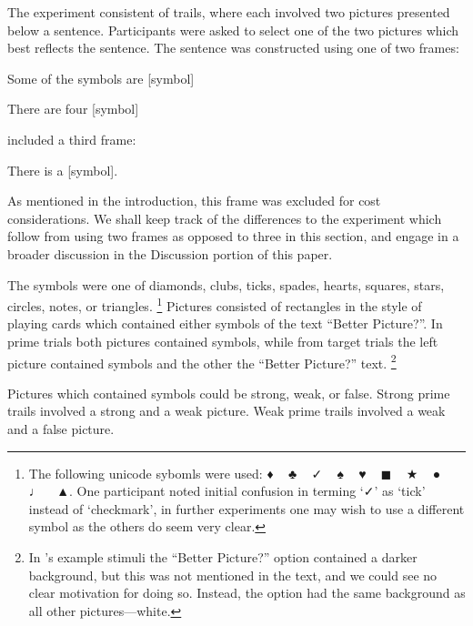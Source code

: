 \documentclass[10pt]{article}
\begin{document}
\begin{multicols}{2}
The experiment consistent of trails, where each involved two pictures presented below a sentence.
Participants were asked to select one of the two pictures which best reflects the sentence.
The sentence was constructed using one of two frames:
\begin{enumerate*}[label=(\roman*)]
\item Some of the symbols are [symbol]
\item There are four [symbol]
\end{enumerate*}
\citeauthor{Bott:2016aa} included a third frame:
\begin{enumerate*}[label=(\roman*), resume]
\item There is a [symbol].
\end{enumerate*}
As mentioned in the introduction, this frame was excluded for cost considerations.
We shall keep track of the differences to the experiment which follow from using two frames as opposed to three in this section, and engage in a broader discussion in the Discussion portion of this paper.

The symbols were one of diamonds, clubs, ticks, spades, hearts, squares, stars, circles, notes, or triangles.\nolinebreak
\footnote{The following unicode sybomls were used: {\space\unifont ♦\space} \mbox{ }  {\space\unifont ♣\space} \mbox{ } {\space\unifont ✓\space} \mbox{ } {\space\unifont ♠\space} \mbox{ } {\space\unifont ♥\space} \mbox{ } {\space\unifont ◼\space} \mbox{ } {\space\unifont ★\space} \mbox{ } {\space\unifont ●\space} \mbox{ } {\space\unifont ♩\space} \mbox{ } {\space\unifont ▲}.
  One participant noted initial confusion in terming `{\unifont ✓}' as `tick' instead of `checkmark', in further experiments one may wish to use a different symbol as the others do seem very clear.}
Pictures consisted of rectangles in the style of playing cards which contained either symbols of the text ``Better Picture?''.
In prime trials both pictures contained symbols, while from target trials the left picture contained symbols and the other the ``Better Picture?'' text.\nolinebreak
\footnote{In \citeauthor{Bott:2016aa}'s example stimuli the ``Better Picture?'' option contained a darker background, but this was not mentioned in the text, and we could see no clear motivation for doing so.
Instead, the option had the same background as all other pictures---white.}

Pictures which contained symbols could be strong, weak, or false.
Strong prime trails involved a strong and a weak picture.
Weak prime trails involved a weak and a false picture.


\end{multicols}
\end{document}
